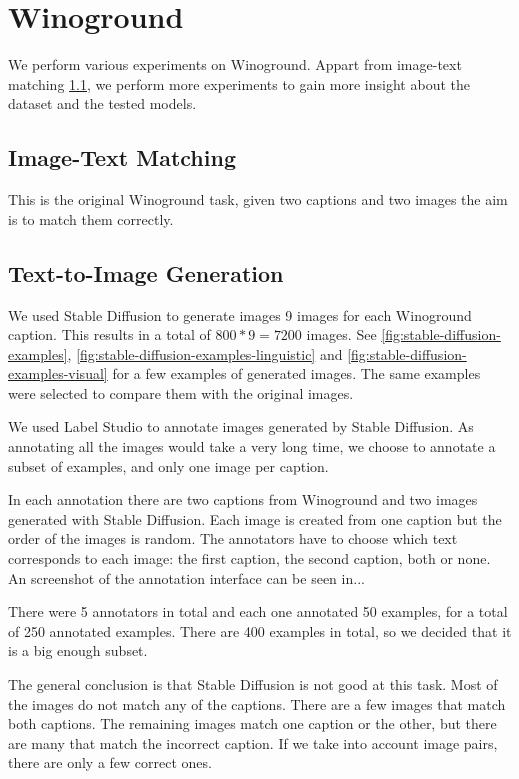 \section{Winoground}

We perform various experiments on Winoground. Appart from image-text matching \ref{image_text_matching}, we perform more experiments to gain more insight about the dataset and the tested models.

\subsection{Image-Text Matching} \label{image_text_matching}

This is the original Winoground task, given two captions and two images the aim is to match them correctly.

\subsection{Text-to-Image Generation} \label{text_to_image_generation}

We used Stable Diffusion \cite{rombach2021highresolution} to generate images 9 images for each Winoground caption. This results in a total of $800*9=7200$ images. See \cref{fig:stable-diffusion-examples}, \cref{fig:stable-diffusion-examples-linguistic} and \cref{fig:stable-diffusion-examples-visual} for a few examples of generated images. The same examples were selected to compare them with the original images. 

We used Label Studio to annotate images generated by Stable Diffusion. As annotating all the images would take a very long time, we choose to annotate a subset of examples, and only one image per caption.

In each annotation there are two captions from Winoground and two images generated with Stable Diffusion. Each image is created from one caption but the order of the images is random. The annotators have to choose which text corresponds to each image: the first caption, the second caption, both or none. An screenshot of the annotation interface can be seen in...

There were 5 annotators in total and each one annotated 50 examples, for a total of 250 annotated examples. There are 400 examples in total, so we decided that it is a big enough subset.

The general conclusion is that Stable Diffusion is not good at this task. Most of the images do not match any of the captions. There are a few images that match both captions. The remaining images match one caption or the other, but there are many that match the incorrect caption. If we take into account image pairs, there are only a few correct ones.

